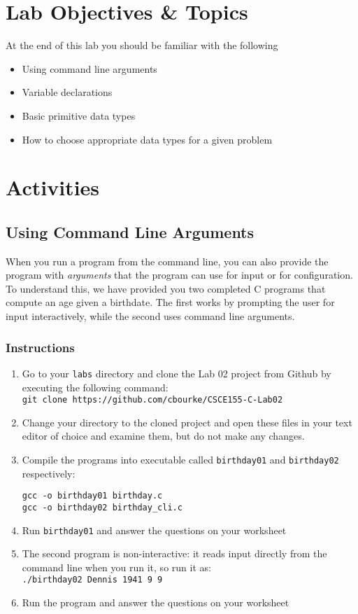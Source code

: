 \documentclass[12pt]{scrartcl}
\begin{document}
\section{Lab Objectives \& Topics}
At the end of this lab you should be familiar with the following
\begin{itemize}
  \item Using command line arguments
  \item Variable declarations 
  \item Basic primitive data types
  \item How to choose appropriate data types for a given problem
\end{itemize}

\section{Activities}

\subsection{Using Command Line Arguments}

When you run a program from the command line, you can also provide 
the program with \emph{arguments} that the program can use for input 
or for configuration.  To understand this, we have provided you two 
completed C programs that compute an age given a birthdate.  The 
first works by prompting the user for input interactively, while the second 
uses command line arguments.

\subsubsection*{Instructions}

\begin{enumerate}
  \item Go to your \texttt{labs} directory and clone the Lab 02 project
  	from Github by executing the following command:\\
	\texttt{git clone https://github.com/cbourke/CSCE155-C-Lab02}
  \item Change your directory to the cloned project and open these files in 
  	your text editor of choice and examine them, but do not make any changes.
  \item Compile the programs into executable called \texttt{birthday01} 
  	and \texttt{birthday02} respectively:\\
	\begin{verbatim}
gcc -o birthday01 birthday.c
gcc -o birthday02 birthday_cli.c
\end{verbatim}
  \item Run \texttt{birthday01} and answer the questions on your worksheet
  \item The second program is non-interactive: it reads input directly from the 
	command line when you run it, so run it as:\\
	\texttt{./birthday02 Dennis 1941 9 9}
  \item Run the program and answer the questions on your worksheet
\end{enumerate}
\end{document}
